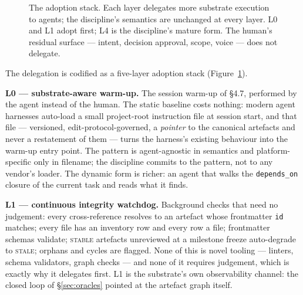 \documentclass[11pt,a4paper,twocolumn]{article}
\begin{document}
\begin{figure}[t]
\centering
{}
\caption{The adoption stack. Each layer delegates more substrate
execution to agents; the discipline's semantics are unchanged at
every layer. L0 and L1 adopt first; L4 is the discipline's mature
form. The human's residual surface --- intent, decision approval,
scope, voice --- does not delegate.}
\label{fig:stack}
\end{figure}

The delegation is codified as a five-layer adoption stack
(Figure~\ref{fig:stack}).

\textbf{L0 --- substrate-aware warm-up.} The session warm-up of
\S4.7, performed by the agent instead of the human. The static
baseline costs nothing: modern agent harnesses auto-load a small
project-root instruction file at session start, and that file ---
versioned, edit-protocol-governed, a \emph{pointer} to the
canonical artefacts and never a restatement of them --- turns the
harness's existing behaviour into the warm-up entry point. The
pattern is agent-agnostic in semantics and platform-specific only
in filename; the discipline commits to the pattern, not to any
vendor's loader. The dynamic form is richer: an agent that walks
the \texttt{depends\_on} closure of the current task and reads
what it finds.

\textbf{L1 --- continuous integrity watchdog.} Background checks
that need no judgement: every cross-reference resolves to an
artefact whose frontmatter \texttt{id} matches; every file has an
inventory row and every row a file; frontmatter schemas validate;
\textsc{stable} artefacts unreviewed at a milestone freeze
auto-degrade to \textsc{stale}; orphans and cycles are flagged.
None of this is novel tooling --- linters, schema validators,
graph checks --- and none of it requires judgement, which is
exactly why it delegates first. L1 is the substrate's own
observability channel: the closed loop of \S\ref{sec:oracles}
pointed at the artefact graph itself.
\end{document}
